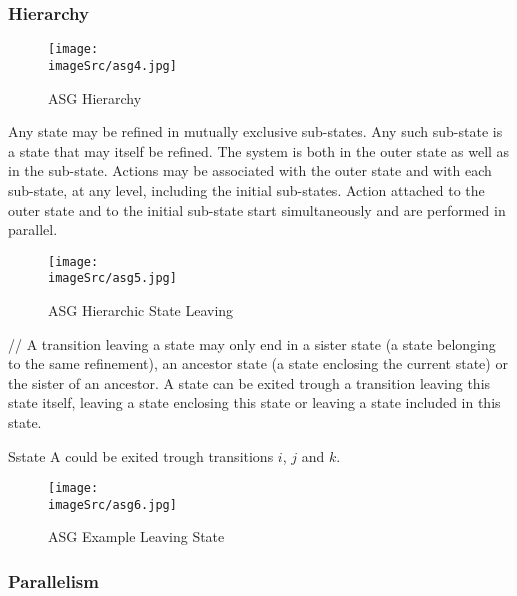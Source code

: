 \documentclass[../main.tex]{subfiles}
\renewcommand{\imageSrc}{../images/}
\begin{document}
\subsubsection{Hierarchy}
\begin{figure}[H]
    \centering
    \texttt{[image: \\imageSrc/asg4.jpg]}
    \caption{ASG Hierarchy}
    \label{asg4}
\end{figure}
Any state may be refined in mutually exclusive sub-states. Any such sub-state is a state that may itself be refined. The system is both in the outer state as well as in the sub-state. Actions may be associated with the outer state and with each sub-state, at any level, including the initial sub-states. Action attached to the outer state and to the initial sub-state start simultaneously and are performed in parallel.
\begin{figure}[H]
    \centering
    \texttt{[image: \\imageSrc/asg5.jpg]}
    \caption{ASG Hierarchic State Leaving}
    \label{asg5}
\end{figure}
//
A transition leaving a state may only end in a sister state (a state belonging to the same refinement), an ancestor state (a state enclosing the current state) or the sister of an ancestor. A state can be exited trough a transition leaving this state itself, leaving a state enclosing this state or leaving a state included in this state.
\begin{exmp}
Sstate A could be exited trough transitions $i$, $j$ and $k$.
\begin{figure}[H]
    \centering
    \texttt{[image: \\imageSrc/asg6.jpg]}
    \caption{ASG Example Leaving State}
    \label{asg6}
\end{figure}
\end{exmp}







\subsubsection{Parallelism}
\end{document}
